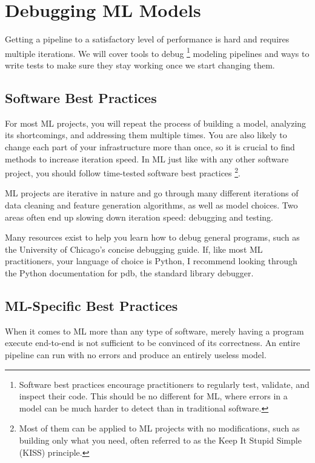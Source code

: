 \section{Debugging ML Models}
Getting a pipeline to a satisfactory level of
performance is hard and requires multiple iterations.
We will cover tools to debug
\footnote{
    Software best practices encourage practitioners
    to regularly test, validate, and inspect their
    code. This should be no different for ML, where
    errors in a model can be much harder to detect
    than in traditional software.
}
modeling pipelines and
ways to write tests to make sure they stay working
once we start changing them.



\subsection{Software Best Practices}
For most ML projects, you will repeat the process
of building a model, analyzing its shortcomings, and
addressing them multiple times. You are also likely
to change each part of your infrastructure more than
once, so it is crucial to find methods to increase
iteration speed. In ML just like with any other
software project, you should follow time-tested
software best practices
\footnote{
    Most of them can be applied to ML projects with
    no modifications, such as building only what you
    need, often referred to as the Keep It Stupid
    Simple (KISS) principle.

    
}.

ML projects are iterative in nature and go through
many different iterations of data cleaning and feature
generation algorithms, as well as model choices.
Two areas often end up slowing down iteration speed:
debugging and testing.

Many resources exist to help you learn how to debug
general programs, such as the University of Chicago's
concise debugging guide. If, like most ML practitioners,
your language of choice is Python, I recommend looking
through the Python documentation for pdb, the standard
library debugger.



\subsection{ML-Specific Best Practices}
When it comes to ML more than any type of software,
merely having a program execute end-to-end is not
sufficient to be convinced of its correctness. An
entire pipeline can run with no errors and produce
an entirely useless model.

